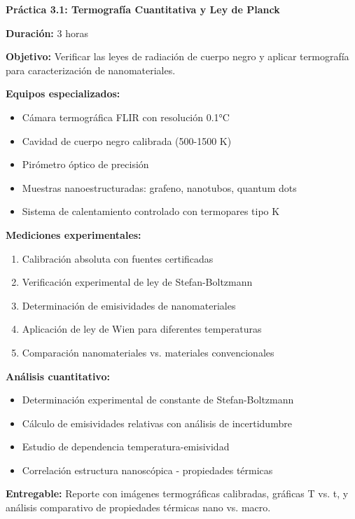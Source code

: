\begin{practicabox}
	\textbf{Práctica 3.1: Termografía Cuantitativa y Ley de Planck}
	
	\textbf{Duración:} 3 horas
	
	\textbf{Objetivo:} Verificar las leyes de radiación de cuerpo negro y aplicar termografía para caracterización de nanomateriales.
	
	\textbf{Equipos especializados:}
	\begin{itemize}
		\item Cámara termográfica FLIR con resolución 0.1°C
		\item Cavidad de cuerpo negro calibrada (500-1500 K)
		\item Pirómetro óptico de precisión
		\item Muestras nanoestructuradas: grafeno, nanotubos, quantum dots
		\item Sistema de calentamiento controlado con termopares tipo K
	\end{itemize}
	
	\textbf{Mediciones experimentales:}
	\begin{enumerate}
		\item Calibración absoluta con fuentes certificadas
		\item Verificación experimental de ley de Stefan-Boltzmann
		\item Determinación de emisividades de nanomateriales
		\item Aplicación de ley de Wien para diferentes temperaturas
		\item Comparación nanomateriales vs. materiales convencionales
	\end{enumerate}
	
	\textbf{Análisis cuantitativo:}
	\begin{itemize}
		\item Determinación experimental de constante de Stefan-Boltzmann
		\item Cálculo de emisividades relativas con análisis de incertidumbre
		\item Estudio de dependencia temperatura-emisividad
		\item Correlación estructura nanoscópica - propiedades térmicas
	\end{itemize}
	
	\textbf{Entregable:} Reporte con imágenes termográficas calibradas, gráficas T vs. t, y análisis comparativo de propiedades térmicas nano vs. macro.
\end{practicabox}

